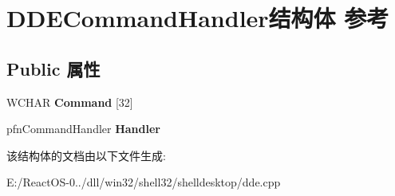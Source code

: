 \hypertarget{struct_d_d_e_command_handler}{}\section{D\+D\+E\+Command\+Handler结构体 参考}
\label{struct_d_d_e_command_handler}
\subsection*{Public 属性}
\begin{DoxyCompactItemize}
\item 
\mbox{\label{struct_d_d_e_command_handler_ae14130931763c3e87d425a06edea7279}} 
W\+C\+H\+AR {\bfseries Command} \mbox{[}32\mbox{]}
\item 
\mbox{\label{struct_d_d_e_command_handler_a2e4b2d161dd72418017c951d2a38f519}} 
pfn\+Command\+Handler {\bfseries Handler}
\end{DoxyCompactItemize}


该结构体的文档由以下文件生成\+:\begin{DoxyCompactItemize}
\item 
E\+:/\+React\+O\+S-\/0../dll/win32/shell32/shelldesktop/dde.\+cpp\end{DoxyCompactItemize}
